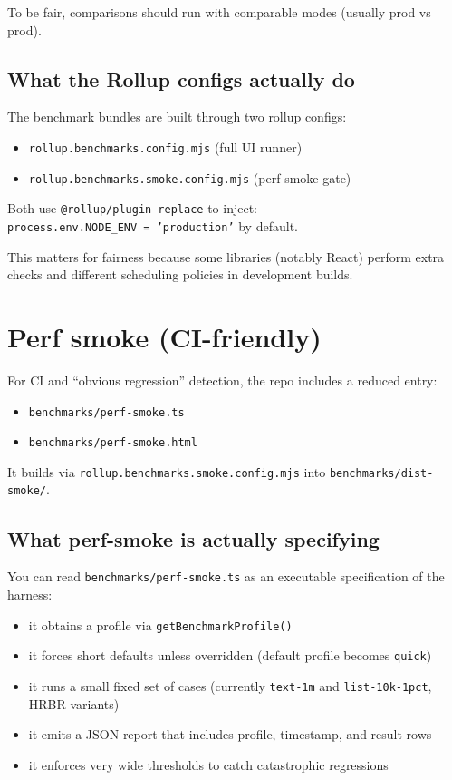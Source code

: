 To be fair, comparisons should run with comparable modes (usually prod vs prod).

\subsection{What the Rollup configs actually do}

The benchmark bundles are built through two rollup configs:

\begin{itemize}
\item \texttt{rollup.benchmarks.config.mjs} (full UI runner)
\item \texttt{rollup.benchmarks.smoke.config.mjs} (perf-smoke gate)
\end{itemize}

Both use \texttt{@rollup/plugin-replace} to inject:\\
	\texttt{process.env.NODE\_ENV = 'production'} by default.

This matters for fairness because some libraries (notably React) perform extra checks and different scheduling policies in development builds.

\section{Perf smoke (CI-friendly)}

For CI and ``obvious regression'' detection, the repo includes a reduced entry:

\begin{itemize}
\item \texttt{benchmarks/perf-smoke.ts}
\item \texttt{benchmarks/perf-smoke.html}
\end{itemize}

It builds via \texttt{rollup.benchmarks.smoke.config.mjs} into \texttt{benchmarks/dist-smoke/}.

\subsection{What perf-smoke is actually specifying}

You can read \texttt{benchmarks/perf-smoke.ts} as an executable specification of the harness:

\begin{itemize}
\item it obtains a profile via \texttt{getBenchmarkProfile()}
\item it forces short defaults unless overridden (default profile becomes \texttt{quick})
\item it runs a small fixed set of cases (currently \texttt{text-1m} and \texttt{list-10k-1pct}, HRBR variants)
\item it emits a JSON report that includes profile, timestamp, and result rows
\item it enforces very wide thresholds to catch catastrophic regressions
\end{itemize}

